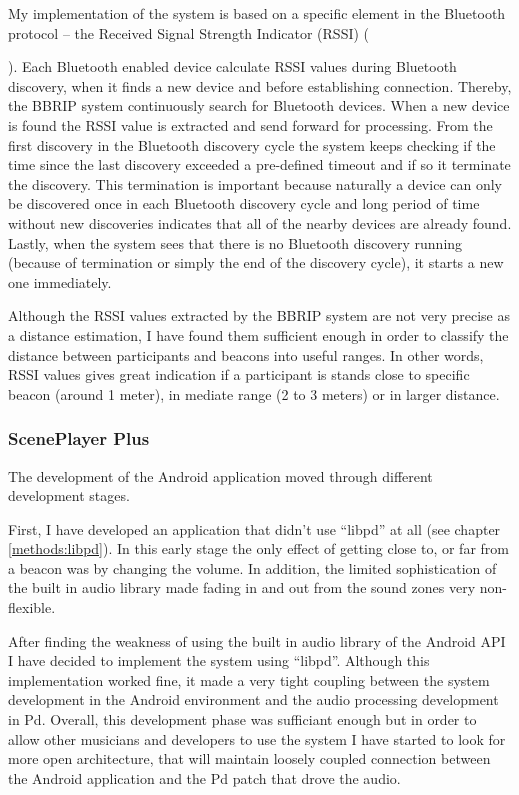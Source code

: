 \documentclass[a4paper,11pt]{article}
\begin{document}
My implementation of the system is based on a specific element in the Bluetooth protocol -- the Received Signal Strength Indicator (RSSI) ({\cite{bray12}).
Each Bluetooth enabled device calculate RSSI values during Bluetooth discovery, when it finds a new device and before establishing connection.
Thereby, the BBRIP system continuously search for Bluetooth devices.
When a new device is found the RSSI value is extracted and send forward for processing.
From the first discovery in the Bluetooth discovery cycle the system keeps checking if the time since the last discovery exceeded a pre-defined timeout and if so it terminate the discovery.
This termination is important because naturally a device can only be discovered once in each Bluetooth discovery cycle and long period of time without new discoveries indicates that all of the nearby devices are already found.
Lastly, when the system sees that there is no Bluetooth discovery running (because of termination or simply the end of the discovery cycle), it starts a new one immediately.

Although the RSSI values extracted by the BBRIP system are not very precise as a distance estimation, I have found them sufficient enough in order to classify the distance between participants and beacons into useful ranges. In other words, RSSI values gives great indication if a participant is stands close to specific beacon (around 1 meter), in mediate range (2 to 3 meters) or in larger distance.

\subsubsection{ScenePlayer Plus}

The development of the Android application moved through different development stages.

First, I have developed an application that didn't use ``libpd'' at all (see chapter \ref{methods:libpd}).
In this early stage the only effect of getting close to, or far from a beacon was by changing the volume.
In addition, the limited sophistication of the built in audio library made fading in and out from the sound zones very non-flexible.

After finding the weakness of using the built in audio library of the Android API I have decided to implement the system using ``libpd''.
Although this implementation worked fine, it made a very tight coupling between the system development in the Android environment and the audio processing development in Pd.
Overall, this development phase was sufficiant enough but in order to allow other musicians and developers to use the system I have started to look for more open architecture, that will maintain loosely coupled connection between the Android application and the Pd patch that drove the audio.

}
\end{document}
